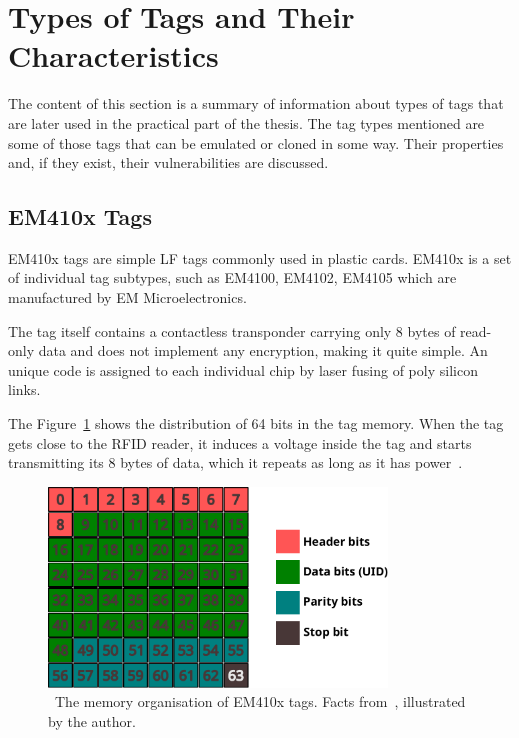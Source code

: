 \section{Types of Tags and Their Characteristics}

The content of this section is a summary of information about types of tags that are later used in the practical part of the thesis. The tag types mentioned are some of those tags that can be emulated or cloned in some way. Their properties and, if they exist, their vulnerabilities are discussed.


\subsection{EM410x Tags}

EM410x tags are simple LF tags commonly used in plastic cards. EM410x is a set of individual tag subtypes, such as EM4100, EM4102, EM4105 which are manufactured by EM Microelectronics.~\cite{krumnikl2015em410x}

The tag itself contains a contactless transponder carrying only 8 bytes of read-only data and does not implement any encryption, making it quite simple. An unique code is assigned to each individual chip by laser fusing of poly silicon links.~\cite{krumnikl2015em410x}

The Figure~\ref{fig:em410xdata} shows the distribution of 64 bits in the tag memory. When the tag gets close to the RFID reader, it induces a voltage inside the tag and starts transmitting its 8 bytes of data, which it repeats as long as it has power~\cite{priority1designEM4100Protocol}.


\begin{figure}[h]
  \centering
  \includegraphics[width=9cm]{text/em410x_data.pdf} %
  \caption[The memory organisation of EM410x tags.]{~The memory organisation of EM410x tags. Facts from~\cite{krumnikl2015em410x}, illustrated by the author.}
  \label{fig:em410xdata}
\end{figure}

